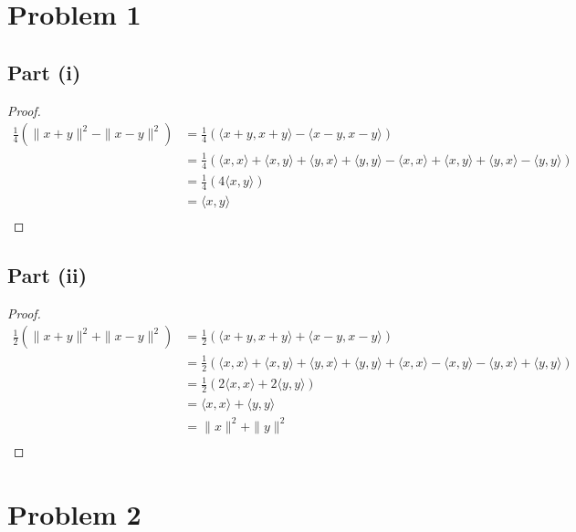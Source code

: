 \documentclass{article}
\begin{document}
\section*{Problem 1}

\subsection*{Part (i)}

\begin{proof}
\begin{align*}
\frac{1}{4} (\|x + y\|^2 - \|x - y\|^2) &= \frac{1}{4} (\langle x + y, x + y \rangle - \langle x - y, x - y \rangle) \\
&= \frac{1}{4}(\langle x, x \rangle + \langle x, y \rangle + \langle y, x \rangle + \langle y, y \rangle - \langle x, x \rangle + \langle x, y \rangle + \langle y, x \rangle - \langle y, y \rangle) \\
&=  \frac{1}{4}(4\langle x, y \rangle) \\
&= \langle x, y \rangle \\
\end{align*}
\end{proof}

\subsection*{Part (ii)}

\begin{proof}
\begin{align*}
\frac{1}{2} (\|x + y\|^2 + \|x - y\|^2) &= \frac{1}{2} (\langle x + y, x + y \rangle + \langle x - y, x - y \rangle) \\
&= \frac{1}{2}(\langle x, x \rangle + \langle x, y \rangle + \langle y, x \rangle + \langle y, y \rangle + \langle x, x \rangle - \langle x, y \rangle - \langle y, x \rangle + \langle y, y \rangle) \\
&=  \frac{1}{2}(2\langle x, x \rangle + 2\langle y, y \rangle) \\
&= \langle x, x \rangle + \langle y, y \rangle \\
&= \|x\|^2 + \|y\|^2 \\
\end{align*}
\end{proof}


\section*{Problem 2}
\end{document}

